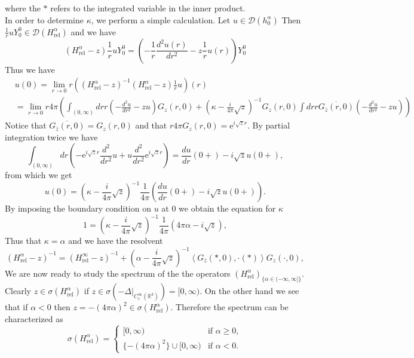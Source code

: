 \documentclass[a4paper,11pt]{article}
\newcommand{\euler}[1]{\text{e}^{#1}}
\newcommand{\dom}[1]{\mathscr D\left(#1\right)}
\renewcommand{\braket}[1]{\left\langle#1\right\rangle}
\newcommand{\R}{\mathbb{R}}
\numberwithin{equation}{section}
\begin{document}
where the $ \ast $ refers to the integrated variable in the inner product.\\
In order to determine $ \kappa $, we perform a simple calculation. Let $ u\in\dom{h^\alpha_0} $ Then $ \frac{1}{r}uY_0^0\in\dom{H_\text{rel}^\alpha} $ and we have \begin{equation}
(H_\text{rel}^\alpha-z)\frac{1}{r}uY_0^0=\left(-\frac{1}{r}\frac{d^2u(r)}{dr^2}-z\frac{1}{r}u(r)\right)Y^0_0
\end{equation}
Thus we have \begin{equation}
\begin{aligned}
&u(0)=\lim\limits_{r\to0}r\left((H_\text{rel}^\alpha-z)^{-1}(H_\text{rel}^\alpha-z)\frac{1}{r}u\right)(r)\\&=\lim\limits_{r\to0}r4\pi\left(\int_{(0,\infty)}drr \left(-\frac{d^2u}{dr^2}-zu\right)G_z(r,0)+(\kappa-\frac{i}{4\pi}\sqrt{z})^{-1}G_z(r,0)\int dr r\overline{G_{\bar{z}}(r,0)}\left(-\frac{d^2u}{dr^2}-zu\right)\right)
\end{aligned}
\end{equation}
Notice that $ \overline{G_{\bar{z}}(r,0)}=G_z(r,0) $ and that $ r4\pi G_z(r,0)=\euler{i\sqrt{z}r} $. By partial integration twice we have
\begin{equation}
\int_{(0,\infty)}dr \left(-\euler{i\sqrt{z}r}\frac{d^2}{dr^2}u+u\frac{d^2}{dr^2}\euler{i\sqrt{z}r}\right)=\frac{du}{dr}(0+)-i\sqrt{z}u(0+),
\end{equation}
from which we get
\begin{equation}
u(0)=(\kappa-\frac{i}{4\pi}\sqrt{z})^{-1}\frac{1}{4\pi}\left(\frac{du}{dr}(0+)-i\sqrt{z}u(0+)\right).
\end{equation}
By imposing the boundary condition on $ u $ at $ 0 $ we obtain the equation for $ \kappa $\begin{equation}
1=(\kappa-\frac{i}{4\pi}\sqrt{z})^{-1}\frac{1}{4\pi}\left(4\pi\alpha-i\sqrt{z}\right),
\end{equation}
Thus that $ \kappa=\alpha $ and we have the resolvent \begin{equation}
(H_{\text{rel}}^\alpha-z)^{-1}=(H_{\text{rel}}^\infty-z)^{-1}+(\alpha-\frac{i}{4\pi}\sqrt{z})^{-1}\braket{G_{\bar{z}}(\ast,0),\cdot(\ast)}G_z(\cdot,0),
\end{equation}
We are now ready to study the spectrum of the the operators $ (H_{\text{rel}}^\alpha)_{\{\alpha\in(-\infty,\infty]\}} $. Clearly $ z\in\sigma(H_{\text{rel}}^\alpha) $ if $ z\in\sigma(-\Delta|_{C_c^\infty(\R^3)})=[0,\infty) $. On the other hand we see that if $ \alpha<0 $ then $ z=-(4\pi\alpha)^2\in\sigma(H_{\text{rel}}^\alpha) $. Therefore the spectrum can be characterized as\begin{equation}
\sigma(H_{\text{rel}}^\alpha)=\begin{cases}
[0,\infty)&\text{if }\alpha\geq0,\\
\{-(4\pi\alpha)^2\}\cup[0,\infty)&\text{if }\alpha<0.
\end{cases}
\end{equation}
\end{document}

